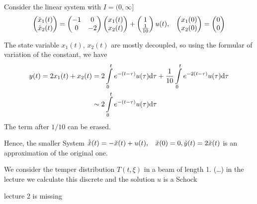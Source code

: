 \begin{exa}
	Consider the linear system with $I=(0,\infty]$
	\begin{align*}
		\begin{pmatrix}
			\dot{x}_1(t) \\\dot{x}_2(t) 
		\end{pmatrix}
		= 
		\begin{pmatrix}
			-1 & 0 \\ 0 & -2
		\end{pmatrix}
		\begin{pmatrix}
			x_1(t) \\ x_2(t)
		\end{pmatrix}
		+
		\begin{pmatrix}
			1 \\ \frac{1}{10}
		\end{pmatrix}
		u(t), \hspace{2ex} 
		\begin{pmatrix}
			x_1(0) \\ x_2(0)
		\end{pmatrix}
		= \begin{pmatrix}
			0 \\ 0
		\end{pmatrix}
	\end{align*}
	
	The state variable $x_1(t)$, $x_2(t)$ are mostly decoupled, so using the formular of variation of the constant, we have
	\begin{eqnarray*}
		y(t)=2x_1(t)+x_2(t) & = 2 \int\limits_0^t e^{- (t- \tau)} u(\tau) \mathrm{d} \tau + \frac{1}{10} \int\limits_0^t e^{-2(t - \tau )} u(\tau) \mathrm{d} \tau \\
		& \sim 2 \int\limits_0^t e^{-(t-\tau)} u(\tau) \mathrm{d} \tau 
	\end{eqnarray*}
	The term after $1/10$ can be erased. 
	
	Hence, the smaller System  $\dot{\tilde{x}}(t)= - \tilde{x}(t) +u(t), \hspace{2ex} \tilde{x}(0)=0, \tilde{y}(t)=2 \tilde{x}(t)$ is an approximation of the original one. 
\end{exa}

\begin{exa}
	We consider the temper distribution $T(t, \xi)$ in a beam of length 1. (\dots) in the lecture we calculate this discrete and the solution $u$ is a \glqq Schock \grqq
\end{exa}

\begin{note}
	lecture 2 is missing
\end{note}

